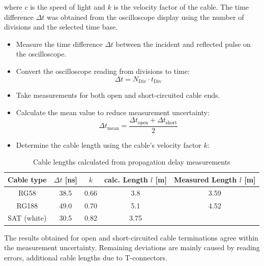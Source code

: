 \documentclass[a4paper,12pt]{article}
\begin{document}
	where $c$ is the speed of light and $k$ is the velocity factor of the cable.
	The time difference $\Delta t$ was obtained from the oscilloscope display using the number of divisions and the selected time base.
	\begin{itemize}
		\item Measure the time difference $\Delta t$ between the incident and reflected pulse on the oscilloscope.
		\item Convert the oscilloscope reading from divisions to time:
		\[
		\Delta t = N_\mathrm{Div} \cdot t_\mathrm{Div}
		\]
		\item Take measurements for both open and short-circuited cable ends.
		\item Calculate the mean value to reduce measurement uncertainty:
		\[
		\Delta t_\mathrm{mean} = \frac{\Delta t_\mathrm{open} + \Delta t_\mathrm{short}}{2}
		\]
		\item Determine the cable length using the cable's velocity factor $k$:
	\end{itemize}
	\begin{table}[h]
		\centering
		\begin{tabular}{|c|c|c|c|c|}
			\hline
			Cable type & $\Delta t$ [ns] & $k$ & calc. Length $l$ [m] & Measured Length $l$ [m]\\
			\hline
			RG58 & 38.5 & 0.66 & 3.8 & 3.59\\
			RG188 & 49.0 & 0.70 & 5.1 & 4.52\\
			SAT (white) & 30.5 & 0.82 & 3.75 & \\
			\hline
		\end{tabular}
		\caption{Cable lengths calculated from propagation delay measurements}
	\end{table}
	
	The results obtained for open and short-circuited cable terminations agree within the measurement uncertainty.
	Remaining deviations are mainly caused by reading errors, additional cable lengths due to T-connectors.

	\vfill
	
		
	
	
	
	
\end{document}

